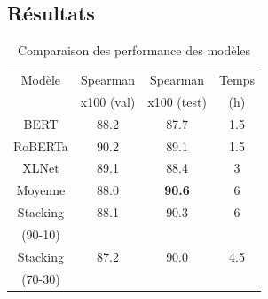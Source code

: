 \documentclass[11pt,a4paper, french]{article}
\begin{document}

\subsection{Résultats}



\begin{table}[h!]
\centering
\begin{tabular}{|c| c c c|}
 \hline
 Modèle & Spearman & Spearman & Temps \\[0.5ex]
 & x100 (val) & x100 (test) & (h) \\
 \hline\hline
 BERT     & 88.2 & 87.7 & 1.5 \\
 \hline
 RoBERTa  & 90.2 & 89.1 & 1.5 \\
 \hline
 XLNet    & 89.1 & 88.4 & 3 \\
 \hline
 Moyenne  & 88.0 & \textbf{90.6} & 6 \\
 \hline
 Stacking & 88.1 & 90.3 & 6 \\
 (90-10)  & & & \\
 \hline
 Stacking & 87.2 & 90.0 & 4.5 \\
 (70-30)  &  & & \\
 \hline
 \hline
\end{tabular}
\caption{Comparaison des performance des modèles}
\label{table:models:results}
\end{table}
%
\end{document}
